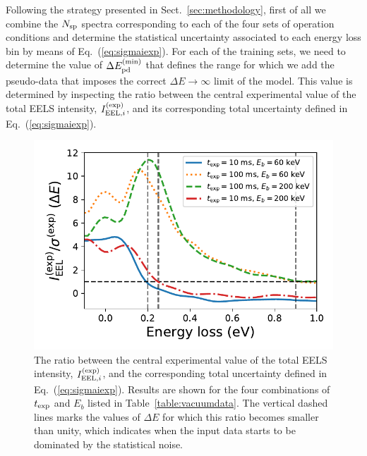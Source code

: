 Following the strategy presented in Sect.~\ref{sec:methodology}, first of all we combine the $N_{\rm sp}$ spectra
corresponding to each of the four sets of operation conditions and determine the statistical uncertainty
associated to each energy loss bin by means of Eq.~(\ref{eq:sigmaiexp}).
%
For each of the training sets, we need to determine the value of $\Delta E_{\rm pd}^{\rm (min)}$
that defines the range for which we add the  pseudo-data
that imposes the correct $\Delta E \to \infty$ limit of the model.
%
This value is determined
by inspecting the ratio between the central experimental value of the total
EELS intensity, $I_{{\rm EEL},i}^{(\rm exp)}$, and its corresponding
total uncertainty defined in Eq.~(\ref{eq:sigmaiexp}).


      
\begin{figure}[t]
    \centering
    \includegraphics[width=120mm]{plots/intensity_to_error_ratio.pdf}
    \caption{The ratio between the central experimental value of the total
      EELS intensity, $I_{{\rm EEL},i}^{(\rm exp)}$, and the corresponding
      total uncertainty defined in Eq.~(\ref{eq:sigmaiexp}).
      Results are shown for the four combinations of $t_{\rm exp}$
      and $E_{b}$ listed in Table~\ref{table:vacuumdata}.
      The vertical dashed lines marks the values of $\Delta E$ for which
      this ratio becomes smaller than unity, which indicates when the input
      data starts to be dominated by the statistical noise.
      }
    \label{fig:intensityratio}
\end{figure}


